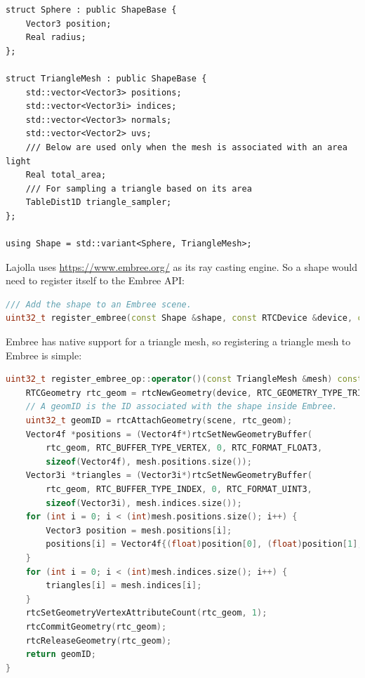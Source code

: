 \documentclass{article}
\begin{document}
\begin{lstlisting}
struct Sphere : public ShapeBase {
    Vector3 position;
    Real radius;
};

struct TriangleMesh : public ShapeBase {
    std::vector<Vector3> positions;
    std::vector<Vector3i> indices;
    std::vector<Vector3> normals;
    std::vector<Vector2> uvs;
    /// Below are used only when the mesh is associated with an area light
    Real total_area;
    /// For sampling a triangle based on its area
    TableDist1D triangle_sampler;
};

using Shape = std::variant<Sphere, TriangleMesh>;
\end{lstlisting}

Lajolla uses \href{Embree}{https://www.embree.org/} as its ray casting engine. So a shape would need to register itself to the Embree API:
\begin{lstlisting}[language=c++]
/// Add the shape to an Embree scene.
uint32_t register_embree(const Shape &shape, const RTCDevice &device, const RTCScene &scene);
\end{lstlisting}

Embree has native support for a triangle mesh, so registering a triangle mesh to Embree is simple:
\begin{lstlisting}[language=c++]
uint32_t register_embree_op::operator()(const TriangleMesh &mesh) const {
    RTCGeometry rtc_geom = rtcNewGeometry(device, RTC_GEOMETRY_TYPE_TRIANGLE);
    // A geomID is the ID associated with the shape inside Embree.
    uint32_t geomID = rtcAttachGeometry(scene, rtc_geom);
    Vector4f *positions = (Vector4f*)rtcSetNewGeometryBuffer(
        rtc_geom, RTC_BUFFER_TYPE_VERTEX, 0, RTC_FORMAT_FLOAT3,
        sizeof(Vector4f), mesh.positions.size());
    Vector3i *triangles = (Vector3i*)rtcSetNewGeometryBuffer(
        rtc_geom, RTC_BUFFER_TYPE_INDEX, 0, RTC_FORMAT_UINT3,
        sizeof(Vector3i), mesh.indices.size());
    for (int i = 0; i < (int)mesh.positions.size(); i++) {
        Vector3 position = mesh.positions[i];
        positions[i] = Vector4f{(float)position[0], (float)position[1], (float)position[2], 0.f};
    }
    for (int i = 0; i < (int)mesh.indices.size(); i++) {
        triangles[i] = mesh.indices[i];
    }
    rtcSetGeometryVertexAttributeCount(rtc_geom, 1);
    rtcCommitGeometry(rtc_geom);
    rtcReleaseGeometry(rtc_geom);
    return geomID;
}
\end{lstlisting}
\end{document}
